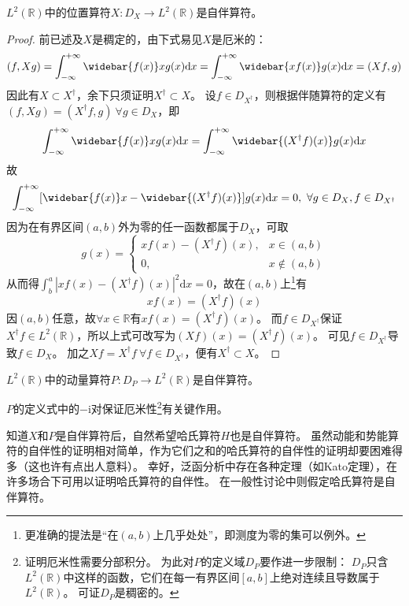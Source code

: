 \begin{theorem}
    $L^2(\mathbb{R})$中的位置算符$X \colon D_X \to L^2(\mathbb{R})$是自伴算符。
\end{theorem}

\begin{proof}
    前已述及$X$是稠定的，由下式易见$X$是厄米的：
    $$(f, Xg) = \int^{+\infty}_{-\infty}\widebar{f(x)}xg(x)\mathrm{d}x = \int^{+\infty}_{-\infty}\widebar{xf(x)}g(x)\mathrm{d}x = (Xf, g)$$
    因此有$X \subset X^\dagger$，余下只须证明$X^\dagger \subset X$。
    设$f \in D_{X^\dagger}$，则根据伴随算符的定义有$(f, Xg) = (X^\dagger f, g) ~ \forall g \in D_X$，即
    $$\int^{+\infty}_{-\infty}\widebar{f(x)}xg(x)\mathrm{d}x = \int^{+\infty}_{-\infty}\widebar{(X^\dagger f)(x)}g(x)\mathrm{d}x$$
    故
    $$\int^{+\infty}_{-\infty}[\widebar{f(x)}x - \widebar{(X^\dagger f)(x)}]g(x)\mathrm{d}x = 0, ~ \forall g \in D_X, f \in D_{X^\dagger}$$
    因为在有界区间$(a, b)$外为零的任一函数都属于$D_X$，可取
    $$g(x) = \begin{cases}
        xf(x) - (X^\dagger f)(x), & x \in (a, b) \\
        0, & x \notin (a, b)
    \end{cases}$$
    从而得$\int^a_b|xf(x) - (X^\dagger f)(x)|^2\mathrm{d}x = 0$，故在$(a, b)$上\footnote{
        更准确的提法是``在$(a, b)$上几乎处处''，即测度为零的集可以例外。
    }有
    $$xf(x) = (X^\dagger f)(x)$$
    因$(a, b)$任意，故$\forall x \in \mathbb{R}$有$xf(x) = (X^\dagger f)(x)$。
    而$f \in D_{X^\dagger}$保证$X^\dagger f \in L^2(\mathbb{R})$，所以上式可改写为$(Xf)(x) = (X^\dagger f)(x)$。
    可见$f \in D_{X^\dagger}$导致$f \in D_X$。
    加之$Xf = X^\dagger f ~ \forall f \in D_{X^\dagger}$，便有$X^\dagger \subset X$。
\end{proof}

\begin{theorem}
    $L^2(\mathbb{R})$中的动量算符$P \colon D_P \to L^2(\mathbb{R})$是自伴算符。
\end{theorem}

\begin{note}
    $P$的定义式中的$-\mathrm{i}$对保证厄米性\footnote{
        证明厄米性需要分部积分。
        为此对$P$的定义域$D_P$要作进一步限制：
        $D_P$只含$L^2(\mathbb{R})$中这样的函数，它们在每一有界区间$[a, b]$上绝对连续且导数属于$L^2(\mathbb{R})$。
        可证$D_P$是稠密的。
    }有关键作用。
\end{note}

知道$X$和$P$是自伴算符后，自然希望哈氏算符$H$也是自伴算符。
虽然动能和势能算符的自伴性的证明相对简单，作为它们之和的哈氏算符的自伴性的证明却要困难得多（这也许有点出人意料）。
幸好，泛函分析中存在各种定理（如Kato定理），在许多场合下可用以证明哈氏算符的自伴性。
在一般性讨论中则假定哈氏算符是自伴算符。

